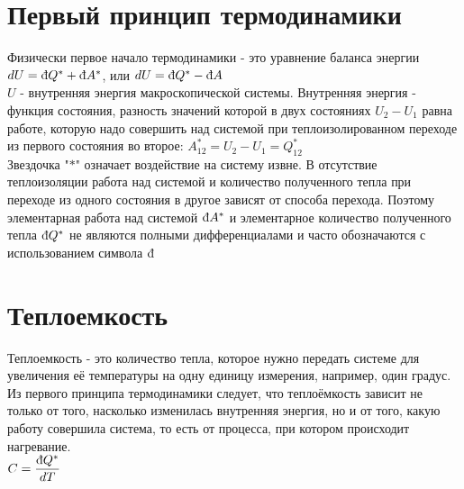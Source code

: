 \begin{multicols*}{2}
		\section{Первый принцип термодинамики}
		Физически первое начало термодинамики - это уравнение баланса энергии\\
		$dU = \mbox{\dj}Q^* + \mbox{\dj}A^*$, или $dU = \mbox{\dj}Q^* - \mbox{\dj}A$\\
		$U$ - внутренняя энергия макроскопической системы. Внутренняя энергия - функция состояния, разность значений которой в двух состояниях $U_2 - U_1$ равна работе, которую надо совершить над системой при теплоизолированном переходе из первого состояния во второе: $A^*_{12} = U_2 - U_1 = Q^*_{12}$\\
		Звездочка "$*$" означает воздействие на систему извне. В отсутствие теплоизоляции работа над системой и количество полученного тепла при переходе из одного состояния в другое зависят от способа перехода. Поэтому элементарная работа над системой $\mbox{\dj}A^*$ и элементарное количество полученного тепла $\mbox{\dj}Q^*$ не являются полными дифференциалами и часто обозначаются с использованием символа $\mbox{\dj}$\\

		\section{Теплоемкость}
		Теплоемкость - это количество тепла, которое нужно передать системе для увеличения её температуры на одну единицу измерения, например, один градус. Из первого принципа термодинамики следует, что теплоёмкость зависит не только от того, насколько изменилась внутренняя энергия, но и от того, какую работу совершила система, то есть от процесса, при котором происходит нагревание.\\
		$C = \dfrac{\mbox{\dj} Q^*}{dT}$\\


\end{multicols*}
